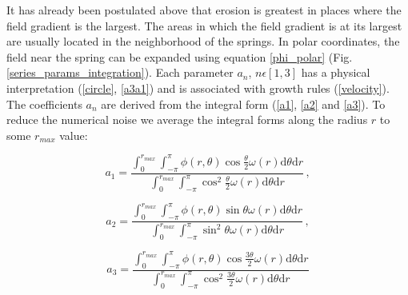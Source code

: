 \documentclass[]{pracamgr}
\begin{document}
      It has already been postulated above that erosion is greatest in places where the field gradient is the largest. The areas in which the field gradient is at its largest are usually located in the neighborhood of the springs. In polar coordinates, the field near the spring can be expanded using equation \ref{phi_polar} (Fig. \ref{series_params_integration}). Each parameter $a_n$, $n \epsilon [1, 3]$ has a physical interpretation (\ref{circle}, \ref{a3a1}) and is associated with growth rules (\ref{velocity}). The coefficients $a_n$ are derived from the integral form (\ref{a1}, \ref{a2} and \ref{a3}). To reduce the numerical noise we average the integral forms along the radius $r$ to some $r_{max}$ value:
      
      \begin{equation}
        \label{a1_num}
        a_1 = \frac{\int^{r_{max}}_{0} \int^{\pi}_{-\pi} \phi(r, \theta) \cos \frac{\theta}{2} \omega(r) \textrm{d} \theta \textrm{d} r}{\int^{r_{max}}_{0} \int^{\pi}_{-\pi} \cos^2 \frac{\theta}{2} \omega(r) \textrm{d} \theta \textrm{d} r} \,,
      \end{equation} 
      
      \begin{equation}
        \label{a2_num}
        a_2 = \frac{\int^{r_{max}}_{0} \int^{\pi}_{-\pi} \phi(r, \theta) \sin \theta \omega(r) \textrm{d} \theta \textrm{d} r}{\int^{r_{max}}_{0} \int^{\pi}_{-\pi} \sin^2 \theta \omega(r) \textrm{d} \theta \textrm{d} r} \,,
      \end{equation}
      
      \begin{equation}
        \label{a3_num}
        a_3 = \frac{\int^{r_{max}}_{0} \int^{\pi}_{-\pi} \phi(r, \theta) \cos \frac{3 \theta}{2} \omega(r) \textrm{d} \theta \textrm{d} r}{\int^{r_{max}}_{0} \int^{\pi}_{-\pi} \cos^2 \frac{3 \theta}{2} \omega(r) \textrm{d} \theta \textrm{d} r}
      \end{equation}	
\end{document}
